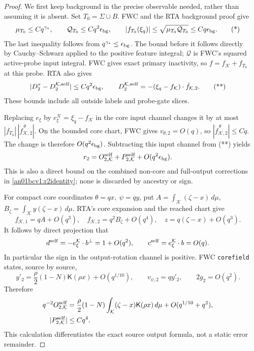 \documentclass[11pt]{article}
\newcommand{\dd}{\,d}
\newcommand{\K}{\mathcal K}
\newcommand{\kf}{\mathsf K}
\begin{document}
\begin{proof}
We first keep background in the precise observable needed, rather
than assuming it is absent. Set \(T_0=\Sigma\cup B\).
FWC and the RTA background proof give
\[
 \mu_{T_0}\le Cq^{\gamma_*},\qquad
 \mathcal Q_{T_0}\le Cq^2\epsilon_{\rm bg},\qquad
 |f_{T_0}(\xi_q)|\le\sqrt{\mu_{T_0}\mathcal Q_{T_0}}
                         \le Cq\epsilon_{\rm bg}.
 \tag{*}
\]
The last inequality follows from \(q^{\gamma_*}\le\epsilon_{\rm bg}\).
The bound before it follows directly by Cauchy--Schwarz applied
to the positive feature integral; \(\mathcal Q\) is FWC's squared
active-probe input integral. FWC gives exact primary inactivity,
so \(f=f_\K+f_{T_0}\) at this probe. RTA also gives
\[
 |D_2^\tau-D_2^{\K,\mathrm{self}}|\le Cq^2\epsilon_{\rm bg},
 \qquad
 D_2^{\K,\mathrm{self}}=-(\xi_q-f_\K)\cdot\dot f_{\K,2}.
 \tag{**}
\]
These bounds include all outside labels and probe-gate slices.

Replacing \(e_\xi\) by \(e_\xi^\K=\xi_q-f_\K\) in the core
input channel changes it by at most
\(|f_{T_0}|\,|\dot f_{\K,2}^{\,\theta}|\).
On the bounded core chart, FWC gives
\(v_{\theta,2}=O(q)\), so
\(|\dot f_{\K,2}^{\,\theta}|\le Cq\).
The change is therefore \(O(q^2\epsilon_{\rm bg})\).
Subtracting this input channel from (**) yields
\begin{equation}
 r_2=O_{2,\K}^{\rm self}+P_{2,\K}^{\rm self}
                       +O(q^2\epsilon_{\rm bg}).
 \label{an01bcv1:r2self}
\end{equation}
This is also a direct bound on the combined non-core and
full-output corrections in \eqref{an01bcv1:r2identity}; none is
discarded by ancestry or sign.

For compact core coordinates \(\theta=qx,\ \psi=qy\), put
\(A=\int_\K(\zeta-x)\dd\mu\), \(B_\zeta=\int_\K y(\zeta-x)\dd\mu\).
RTA's core expansion and the reached chart give
\[
 f_{\K,1}=qA+O(q^3),\quad f_{\K,2}=q^2B_\zeta+O(q^4),
 \quad z=q(\zeta-x)+O(q^3).
\]
It follows by direct projection that
\[
 d^{\rm self}=-e_\xi^\K\cdot b^\perp=1+O(q^2),
 \qquad c^{\rm self}=e_\xi^\K\cdot b=O(q).
\]
In particular the sign in the output-rotation channel is positive.
FWC \texttt{corefield} states, source by source,
\[
 y'_2=\frac{\rho}{2}(1-N)\kf(\rho x)+O(q^{1/10}),
 \qquad v_{\psi,2}=q y'_2,\qquad 2g_2=O(q^2).
\]
Therefore
\begin{align}
 q^{-2}O_{2,\K}^{\rm self}
 &=\frac{\rho}{2}(1-N)
       \int_\K(\zeta-x)\kf(\rho x)\dd\mu
                +O(q^{1/10}+q^2),\notag\\
 |P_{2,\K}^{\rm self}|&\le Cq^4.
 \label{an01bcv1:outputexpansion}
\end{align}
This calculation differentiates the exact source output formula,
not a static error remainder.


\end{proof}
\end{document}
